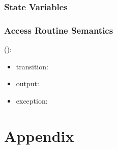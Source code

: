 \documentclass[12pt, titlepage]{article}
\begin{document}
\subsubsection{State Variables}


\subsubsection{Access Routine Semantics}

\noindent {}():
\begin{itemize}
\item transition:  
\item output:  
\item exception:  
\end{itemize}


\newpage




\newpage

\section{Appendix} \label{Appendix}

\end{document}
